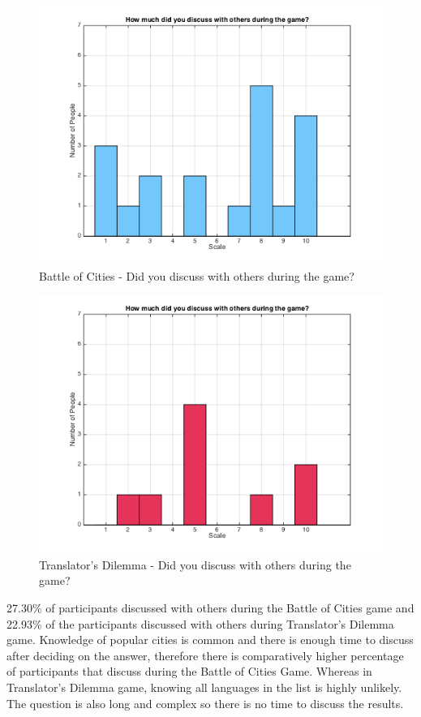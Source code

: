 \documentclass{sig-alternate}
\begin{document}
\begin{figure}
	\includegraphics[width=\linewidth]{p_discuss.png}
	\caption{Battle of Cities - Did you discuss with others during the game?}
	\label{fig:p_discuss}
\end{figure}

\begin{figure}
	\includegraphics[width=\linewidth]{t_discuss.png}
	\caption{Translator's Dilemma - Did you discuss with others during the game?}
	\label{fig:t_discuss}
\end{figure}

27.30\% of participants discussed with others during the Battle of Cities game and 22.93\% of the participants discussed with others during Translator's Dilemma game. Knowledge of popular 
cities is common and there is enough time to discuss after deciding on the answer, therefore 
there is comparatively higher percentage of participants that discuss during the Battle of Cities Game. Whereas 
in Translator's Dilemma game, knowing all languages in the list is highly unlikely. 
The question is also long and complex so there is no time to discuss the results. 
\end{document}

